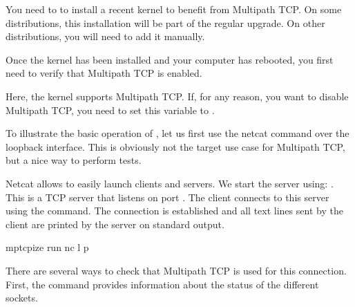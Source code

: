 \documentclass[letterpaper,10pt,english]{sphinxmanual}
\begin{document}
\sphinxAtStartPar
You need to to install a recent kernel to benefit from Multipath TCP. On some distributions, this installation will be part of the regular upgrade. On other distributions, you will need to add it manually.

\sphinxAtStartPar
Once the kernel has been installed and your computer has rebooted, you first need to verify that Multipath TCP is enabled.

\begin{sphinxVerbatim}[commandchars=\\\{\}]
\end{sphinxVerbatim}

\sphinxAtStartPar
Here, the kernel supports Multipath TCP. If, for any reason, you want to disable Multipath TCP, you need to set this  variable to .

\sphinxAtStartPar
To illustrate the basic operation of , let us first use the netcat command over the loopback interface. This is obviously not the target use case for Multipath TCP, but a nice way to perform tests.

\sphinxAtStartPar
Netcat allows to easily launch clients and servers. We start the server using: . This is a TCP server that listens on port . The client connects to this server using the  command. The connection is established and all text lines sent by the client are printed by the server on standard output.

\begin{sphinxVerbatim}[commandchars=\\\{\}]
mptcpize run nc \PYGZhy{}l \PYGZhy{}p 
\end{sphinxVerbatim}

\sphinxAtStartPar
There are several ways to check that Multipath TCP is used for this connection. First, the  command provides information about the status of the different sockets.

\begin{sphinxVerbatim}[commandchars=\\\{\}]
\end{sphinxVerbatim}
\end{document}
